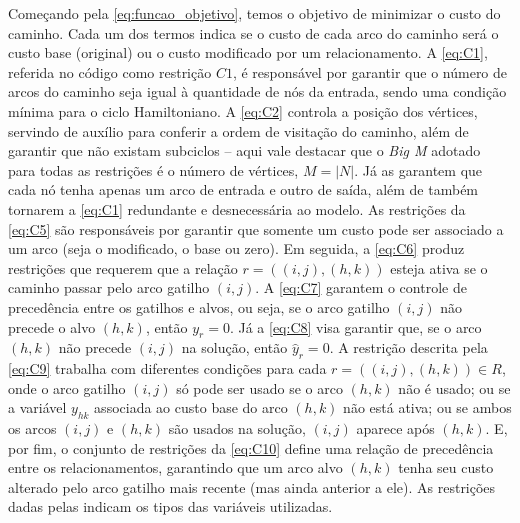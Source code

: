 Começando pela \cref{eq:funcao_objetivo}, temos o objetivo de minimizar o custo do caminho. Cada um dos termos indica se o custo de cada arco do caminho será o custo base (original) ou o custo modificado por um relacionamento. A \cref{eq:C1}, referida no código como restrição $C1$, é responsável por garantir que o número de arcos do caminho seja igual à quantidade de nós da entrada, sendo uma condição mínima para o ciclo Hamiltoniano. A \cref{eq:C2} controla a posição dos vértices, servindo de auxílio para conferir a ordem de visitação do caminho, além de garantir que não existam subciclos -- aqui vale destacar que o \emph{Big M} adotado para todas as restrições é o número de vértices, $M = |N|$. Já as  garantem que cada nó tenha apenas um arco de entrada e outro de saída, além de também tornarem a \cref{eq:C1} redundante e desnecessária ao modelo. As restrições da \cref{eq:C5} são responsáveis por garantir que somente um custo pode ser associado a um arco (seja o modificado, o base ou zero). Em seguida, a \cref{eq:C6} produz restrições que requerem que a relação $r=((i,j), (h,k))$ esteja ativa se o caminho passar pelo arco gatilho $(i,j)$. A \cref{eq:C7} garantem o controle de precedência entre os gatilhos e alvos, ou seja, se o arco gatilho $(i,j)$ não precede o alvo $(h,k)$, então $y_r = 0$. Já a \cref{eq:C8} visa garantir que, se o arco $(h,k)$ não precede $(i,j)$ na solução, então $\hat{y}_r = 0$. A restrição descrita pela \cref{eq:C9} trabalha com diferentes condições para cada $r=((i,j), (h,k)) \in R$, onde o arco gatilho $(i,j)$ só pode ser usado se o arco $(h,k)$ não é usado; ou se a variável $y_{hk}$ associada ao custo base do arco $(h,k)$ não está ativa; ou se ambos os arcos $(i,j)$ e $(h,k)$ são usados na solução, $(i,j)$ aparece após $(h,k)$. E, por fim, o conjunto de restrições da \cref{eq:C10} define uma relação de precedência entre os relacionamentos, garantindo que um arco alvo $(h,k)$ tenha seu custo alterado pelo arco gatilho mais recente (mas ainda anterior a ele). As restrições dadas pelas  indicam os tipos das variáveis utilizadas.
